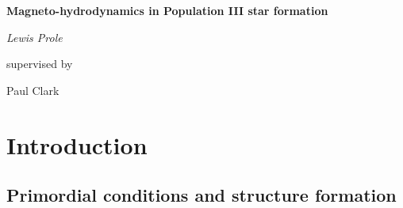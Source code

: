 \documentclass[11pt]{article}
\begin{document}
\begin{titlepage}
    \begin{center}

			{\huge\bfseries Magneto-hydrodynamics in Population III star formation\par}
			\vspace{2cm}
			{\Large\itshape Lewis Prole\par}
			\vfill
			supervised by\par
			Paul Clark

			\vfill


    \end{center}
\end{titlepage}

\tableofcontents
\thispagestyle{empty}

\newpage
\setcounter{page}{1} %
\section{Introduction} %
\label{sec:intro}

\subsection{Primordial conditions and structure formation}
\label{sub:prim_cond}
\end{document}
